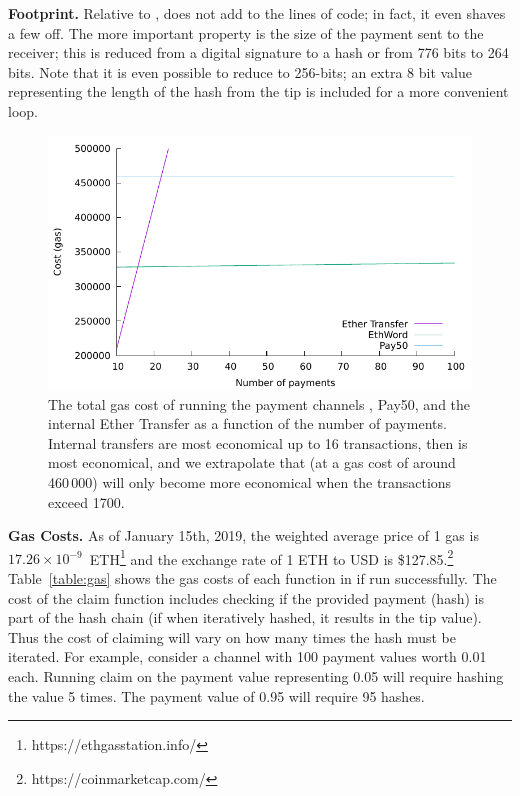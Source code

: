 \textbf{Footprint.} Relative to \fifty, \ew does not add to the lines of code; in fact, it even shaves a few off. The more important property is the size of the payment sent to the receiver; this is reduced from a digital signature to a hash or from 776 bits to 264 bits. Note that it is even possible to reduce \eww to 256-bits; an extra 8 bit value representing the length of the hash from the tip is included for a more convenient loop.

\begin{figure}[t]
\centering

\includegraphics[width=0.75\linewidth]{figures/gas.pdf}
\setlength{\belowcaptionskip}{-10pt}
\caption{The total gas cost of running the payment channels \ew, \textsf{Pay50}, and the internal Ether Transfer as a function of the number of payments. Internal transfers are most economical up to 16 transactions, then \ew is most economical, and we extrapolate that \fifty (at a gas cost of around 460\,000) will only become more economical when the transactions exceed 1700.\label{fig:gas}}
	
\end{figure}

\textbf{Gas Costs.} As of January 15th, 2019, the weighted average price of 1 gas is $17.26\times10^{-9}$~ETH\footnote{https://ethgasstation.info/} and the exchange rate of 1 ETH to USD is \$127.85.\footnote{https://coinmarketcap.com/} Table~\ref{table:gas} shows the gas costs of each function in \ew if run successfully. The cost of the claim function includes checking if the provided payment (hash) is part of the hash chain (if when iteratively hashed, it results in the tip value). Thus the cost of claiming will vary on how many times the hash must be iterated. For example, consider a channel with 100 payment values worth 0.01 \eth each. Running claim on the payment value representing 0.05 \eth will require hashing the value 5 times. The payment value of 0.95 \eth will require 95 hashes. 

